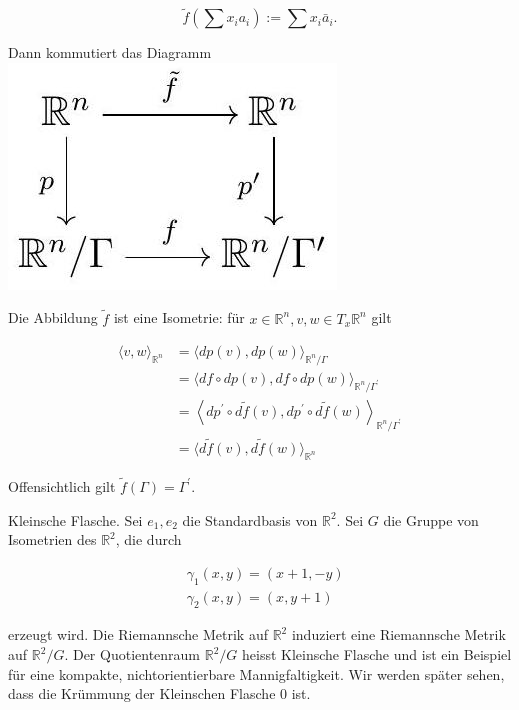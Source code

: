\documentclass[10pt, letterpaper]{article}
\begin{document}
$$
\tilde{f}\left(\sum x_{i} a_{i}\right):=\sum x_{i} \bar{a}_{i} .
$$

Dann kommutiert das Diagramm\\
\includegraphics[max width=\textwidth, center]{2025_05_20_3825c151ba0898b77b6eg-019}

Die Abbildung $\tilde{f}$ ist eine Isometrie: für $x \in \mathbb{R}^{n}, v, w \in T_{x} \mathbb{R}^{n}$ gilt

$$
\begin{aligned}
\langle v, w\rangle_{\mathbb{R}^{n}} & =\langle d p(v), d p(w)\rangle_{\mathbb{R}^{n} / \Gamma} \\
& =\langle d f \circ d p(v), d f \circ d p(w)\rangle_{\mathbb{R}^{n} / \Gamma^{\prime}} \\
& =\left\langle d p^{\prime} \circ d \tilde{f}(v), d p^{\prime} \circ d \tilde{f}(w)\right\rangle_{\mathbb{R}^{n} / \Gamma^{\prime}} \\
& =\langle d \tilde{f}(v), d \tilde{f}(w)\rangle_{\mathbb{R}^{n}}
\end{aligned}
$$

Offensichtlich gilt $\tilde{f}(\Gamma)=\Gamma^{\prime}$.

Kleinsche Flasche. Sei $e_{1}, e_{2}$ die Standardbasis von $\mathbb{R}^{2}$. Sei $G$ die Gruppe von Isometrien des $\mathbb{R}^{2}$, die durch

$$
\begin{aligned}
& \gamma_{1}(x, y)=(x+1,-y) \\
& \gamma_{2}(x, y)=(x, y+1)
\end{aligned}
$$

erzeugt wird. Die Riemannsche Metrik auf $\mathbb{R}^{2}$ induziert eine Riemannsche Metrik auf $\mathbb{R}^{2} / G$. Der Quotientenraum $\mathbb{R}^{2} / G$ heisst Kleinsche Flasche und ist ein Beispiel für eine kompakte, nichtorientierbare Mannigfaltigkeit. Wir werden später sehen, dass die Krümmung der Kleinschen Flasche 0 ist.
\end{document}
